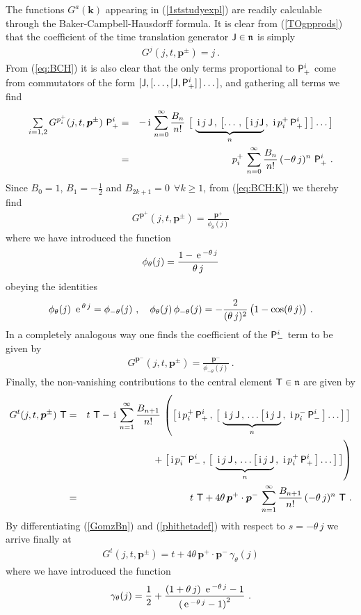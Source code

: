 \documentclass[11pt,a4paper]{article}
\newcommand{\1}{\mathbb{1}}
\newcommand{\mbf}[1]{{\boldsymbol {#1} }}
\def\ii{{\,{\rm i}\,}}
\def\P{{\sf P}}
\def\T{{\sf T}}
\def\J{{\sf J}}
\def\mk{{\mbf k}}
\def\mbp{{\mbf p}}
\def\mfn{{\mathfrak n}}
\def\e{{\,\rm e}\,}
\def\bea{\begin{eqnarray}}
\def\eea{\end{eqnarray}}
\newcommand{\beq}{\begin{eqnarray}}
\newcommand{\eeq}{\end{eqnarray}}
\begin{document}
The functions $G^a(\mk)$ appearing in (\ref{1ststudyexpl}) are readily
calculable through the Baker-Campbell-Hausdorff formula. It is clear
from (\ref{TOgpprods}) that the coefficient of the time translation
generator $\J\in\mfn$ is simply
\beq
G^j(j,t,\mbp^\pm)=j \ .
\label{Gj}\eeq
From (\ref{eq:BCH}) it is also clear that the only terms proportional
to $\P^i_+$ come from commutators of the form
$[\J,[\dots,[\J,\P^i_+]\,]\dots]$, and gathering all terms we find
\bea
\mbox{$\sum\limits_{i=1,2}$}\,
G^{p_i^+}(j,t,\mbp^\pm)~\P^i_+&=&-\ii\sum_{n=0}^\infty
\frac{B_n}{n!}~\bigl[~\underbrace{\ii j\,\J\,,\,\bigl[\dots\,,\,
\bigl[\ii j\J}_n\,,\,\ii p_i^+\,\P^i_+\,\bigr]\,\bigr]
\dots\bigr]\nonumber\\ &=&
p_i^+\,\sum_{n=0}^\infty\frac{B_n}{n!}\,
(-\theta\,j)^n~\P^i_+ \ .
\label{GomzBn}\eea
Since $B_0=1$, $B_1=-\frac12$ and $B_{2k+1}=0~~\forall k\geq1$, from
(\ref{eq:BCH:K}) we thereby find
\beq
G^{\mbp^+}(j,t,\mbp^\pm)=\frac{\mbp^+}
{\phi_\theta(j)}
\label{Gomz}\eeq
where we have introduced the function
\beq
\phi_\theta(j)=\frac{1-\e^{-\theta\,j}}{\theta\,j}
\label{phithetadef}\eeq
obeying the identities
\beq
\phi_\theta(j)~\e^{\theta\,j}=\phi_{-\theta}(j) \ , \quad
\phi_\theta(j)\,\phi_{-\theta}(j)=-\frac2{(\theta\,j)^2}\,\bigl(
1-\cos(\theta\,j)\bigr) \ .
\label{phithetaids}\eeq
In a completely analogous way one finds the coefficient of the
$\P^i_-$ term to be given by
\beq
G^{\mbp^-}(j,t,\mbp^\pm)=\frac{\mbp^-}
{{\phi_{-\theta}(j)}} \ .
\label{Gmz}\eeq
Finally, the non-vanishing contributions to the central
element $\T\in\mfn$ are given by
\bea
G^t(j,t,\mbp^\pm)~\T&=&
t~\T-\ii\sum_{n=1}^\infty\frac{B_{n+1}}{n!}\,
\left(\bigl[\ii p_i^+\,\P^i_+\,,\,\bigl[~
\underbrace{\ii j\,\J\,,\,\dots\bigl[\ii j\,\J}_n\,,\,\ii p_i^-\,
\P^i_-\,\bigr]\dots\bigr]\,\bigr]\right.\nonumber\\ &&\qquad\qquad\qquad
+\left.\bigl[\ii p_i^-\,\P^i_-\,,\,\bigl[~
\underbrace{\ii j\,\J\,,\,\dots\bigl[\ii j\,\J}_n\,,\,
\ii p_i^+\,\P^i_+\,\bigr]\dots\bigr]\,\bigr]\right)
\nonumber\\ &=&t~\T+4\theta\,\mbp^+\cdot\mbp^-\,\sum_{n=1}^\infty\frac{B_{n+1}}
{n!}\,(-\theta\,j)^n~\T \ .
\label{GtBn}\eea
By differentiating (\ref{GomzBn}) and (\ref{phithetadef}) with respect
to $s=-\theta\,j$ we arrive finally at
\beq
G^t(j,t,\mbp^\pm)=t+4\theta\,\mbp^+\cdot\mbp^-\,
\gamma_\theta(j)
\label{Gt}\eeq
where we have introduced the function
\beq
\gamma_\theta(j)=\frac12+\frac{(1+\theta\,j)~\e^{-\theta\,j}-1}
{\left(\e^{-\theta\,j}-1\right)^2} \ .
\label{gammathetadef}\eeq
\end{document}
